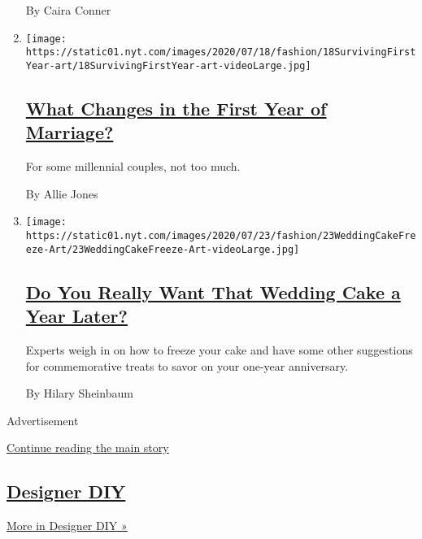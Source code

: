 \begin{enumerate}
  By Caira Conner
\item
  \texttt{[image: https://static01.nyt.com/images/2020/07/18/fashion/18SurvivingFirstYear-art/18SurvivingFirstYear-art-videoLarge.jpg]}

  \hypertarget{what-changes-in-the-first-year-of-marriage}{%
  \subsection{\texorpdfstring{\href{/2020/07/23/fashion/weddings/what-changes-in-the-first-year-of-marriage.html}{What
  Changes in the First Year of
  Marriage?}}{What Changes in the First Year of Marriage?}}\label{what-changes-in-the-first-year-of-marriage}}

  For some millennial couples, not too much.

  By Allie Jones
\item
  \texttt{[image: https://static01.nyt.com/images/2020/07/23/fashion/23WeddingCakeFreeze-Art/23WeddingCakeFreeze-Art-videoLarge.jpg]}

  \hypertarget{do-you-really-want-that-wedding-cake-a-year-later}{%
  \subsection{\texorpdfstring{\href{/2020/07/22/fashion/weddings/do-you-really-want-that-wedding-cake-a-year-later.html}{Do
  You Really Want That Wedding Cake a Year
  Later?}}{Do You Really Want That Wedding Cake a Year Later?}}\label{do-you-really-want-that-wedding-cake-a-year-later}}

  Experts weigh in on how to freeze your cake and have some other
  suggestions for commemorative treats to savor on your one-year
  anniversary.

  By Hilary Sheinbaum
\end{enumerate}

Advertisement

\protect\hyperlink{after-mid2}{Continue reading the main story}

\hypertarget{designer-diy}{%
\subsection{\texorpdfstring{\href{/issue/fashion/2020/06/19/designer-diy}{Designer
DIY}}{Designer DIY}}\label{designer-diy}}

\href{/issue/fashion/2020/06/19/designer-diy}{More in Designer DIY »}

